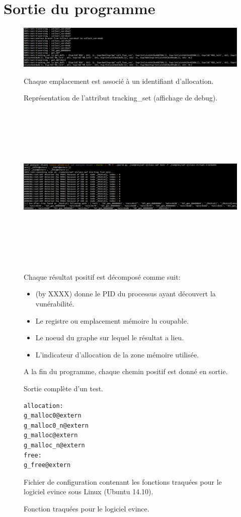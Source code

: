 \chapter{Sortie du programme}
\begin{figure}[h]
    \centering
    \includegraphics[scale=0.5]{images/tracking-set.png}
    \caption{Représentation de l'attribut tracking\_set (affichage de debug).}
    Chaque emplacement est associé à un identifiant d'allocation.
\end{figure}
\begin{figure}[h]
    \includegraphics[height=8cm]{images/output-samples.png}
    \caption{Sortie complète d'un test.}
    Chaque résultat positif est décomposé comme suit:
    \begin{itemize}
        \item (by XXXX) donne le PID du processus ayant découvert la vunérabilité.
        \item Le registre ou emplacement mémoire lu coupable.
        \item Le noeud du graphe sur lequel le résultat a lieu.
        \item L'indicateur d'allocation de la zone mémoire utilisée.
    \end{itemize}
    A la fin du programme, chaque chemin positif est donné en sortie.
\end{figure}

\begin{figure}[h]
    \centering
    \begin {lstlisting}[frame=single]
allocation:
g_malloc0@extern
g_malloc0_n@extern
g_malloc@extern
g_malloc_n@extern
free:
g_free@extern
    \end{lstlisting}
    \caption{Fonction traquées pour le logiciel evince. }
    Fichier de configuration contenant les fonctions traquées pour le logiciel
evince sous Linux (Ubuntu 14.10).
\end{figure}

